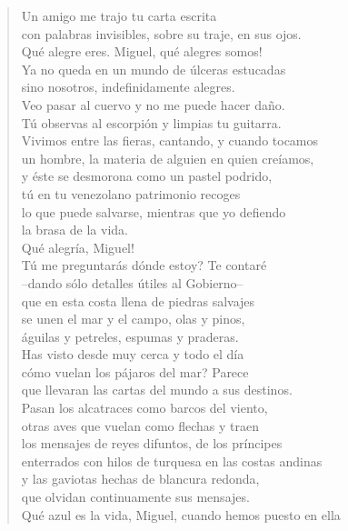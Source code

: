 \documentclass[12pt]{article}
\begin{document}
\clearpage
{}
\begin{verse}

Un amigo me trajo tu carta escrita\\
con palabras invisibles, sobre su traje, en sus ojos.\\
Qué alegre eres. Miguel, qué alegres somos!\\
Ya no queda en un mundo de úlceras estucadas\\
sino nosotros, indefinidamente alegres.\\
Veo pasar al cuervo y no me puede hacer daño.\\
Tú observas al escorpión y limpias tu guitarra.\\
Vivimos entre las fieras, cantando, y cuando tocamos\\
un hombre, la materia de alguien en quien creíamos,\\
y éste se desmorona como un pastel podrido,\\
tú en tu venezolano patrimonio recoges\\
lo que puede salvarse, mientras que yo defiendo\\
la brasa de la vida.\\
Qué alegría, Miguel!\\
Tú me preguntarás dónde estoy? Te contaré\\
--dando sólo detalles útiles al Gobierno--\\
que en esta costa llena de piedras salvajes\\
se unen el mar y el campo, olas y pinos,\\
águilas y petreles, espumas y praderas.\\
Has visto desde muy cerca y todo el día\\
cómo vuelan los pájaros del mar? Parece\\
que llevaran las cartas del mundo a sus destinos.\\
Pasan los alcatraces como barcos del viento,\\
otras aves que vuelan como flechas y traen\\
los mensajes de reyes difuntos, de los príncipes\\
enterrados con hilos de turquesa en las costas andinas\\
y las gaviotas hechas de blancura redonda,\\
que olvidan continuamente sus mensajes.\\
Qué azul es la vida, Miguel, cuando hemos puesto en ella\\

\end{verse}
\end{document}
